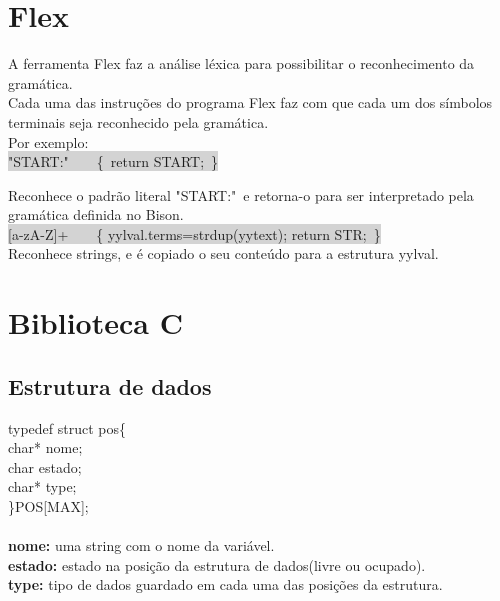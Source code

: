 \documentclass{report}
\begin{document}
\section{Flex}
A ferramenta Flex faz a análise léxica para possibilitar o reconhecimento da gramática.\\
Cada uma das instruções do programa Flex faz com que cada um dos símbolos terminais seja reconhecido pela gramática.\\
Por exemplo:\\
\colorbox{lightgray}{"START:"\ \ \ \ \{\  return START;\	\}  }

Reconhece o padrão literal "START:"\ e retorna-o para ser interpretado pela gramática definida no Bison.\\
\colorbox{lightgray}{[a-zA-Z]+\ \ \ \ \{ yylval.terms=strdup(yytext); return STR;\ \}}\\
Reconhece strings, e é copiado o seu conteúdo para a estrutura yylval.

\section{Biblioteca C}
\subsection{Estrutura de dados}
typedef struct pos\{\\
	char* nome;\\
	char estado;\\
    char* type;\\
\}POS[MAX];
\\
\\
\textbf{nome:} uma string com o nome da variável.\\
\textbf{estado:} estado na posição da estrutura de dados(livre ou ocupado).\\
\textbf{type:} tipo de dados guardado em cada uma das posições da estrutura.\\
\end{document}
